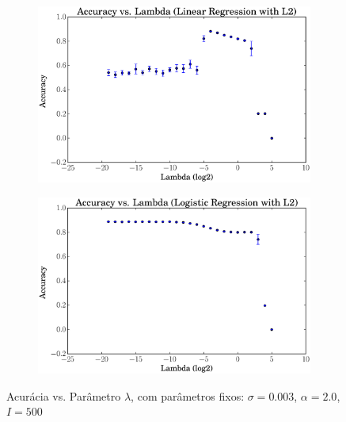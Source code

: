 \documentclass[a4paper, 12pt]{article}
\begin{document}
\begin{figure}[htpb]
    \centering
    \begin{subfigure}[htpb]{0.45\textwidth}
        \includegraphics[width=\textwidth]{acc_vs_lambda_linregL2}
        \caption{}
        \label{fig:lambda_linregL2}
    \end{subfigure}
    \begin{subfigure}[htpb]{0.45\textwidth}
        \includegraphics[width=\textwidth]{acc_vs_lambda_logregL2}
        \caption{}
        \label{fig:lambda_logregL2}
    \end{subfigure}
    \caption{Acurácia vs. Parâmetro $\lambda$, com parâmetros fixos:
    $\sigma=0.003$, $\alpha=2.0$, $I=500$}\label{fig:lambda}
\end{figure}
\end{document}
